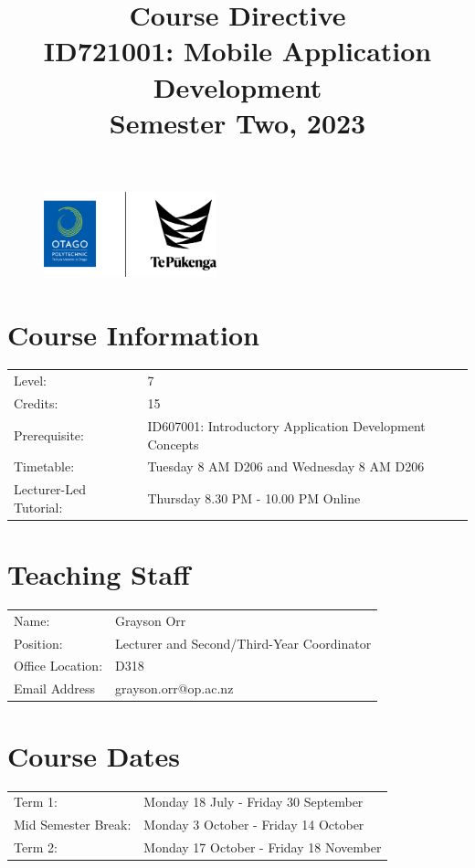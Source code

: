\documentclass{article}
\author{}
\begin{document}
\begin{figure}
	\includegraphics[width=50mm]{../img/logo.png}
\end{figure}

\title{Course Directive\\ID721001: Mobile Application Development\\Semester Two, 2023}
\date{}
\maketitle

\section*{Course Information}
\begin{tabular}{ll}
	Level:        & 7 \\
	Credits:      & 15                                              \\
	Prerequisite: & ID607001: Introductory Application Development Concepts \\
	Timetable:    & Tuesday 8 AM D206 and Wednesday 8 AM D206\\
	Lecturer-Led Tutorial: & Thursday 8.30 PM - 10.00 PM Online     \\     
\end{tabular}  

\section*{Teaching Staff}
\begin{tabular}{ll}
	Name:            & Grayson Orr                           \\
	Position:        & Lecturer and Second/Third-Year Coordinator \\
	Office Location: & D318                                 \\
	Email Address    & grayson.orr@op.ac.nz                    \\
\end{tabular}

\section*{Course Dates}
\begin{tabular}{ll}
	Term 1:             &  Monday 18 July - Friday 30 September \\
	Mid Semester Break: &  Monday 3 October - Friday 14 October     \\
	Term 2:             &  Monday 17 October - Friday 18 November      \\
\end{tabular}
\end{document}
